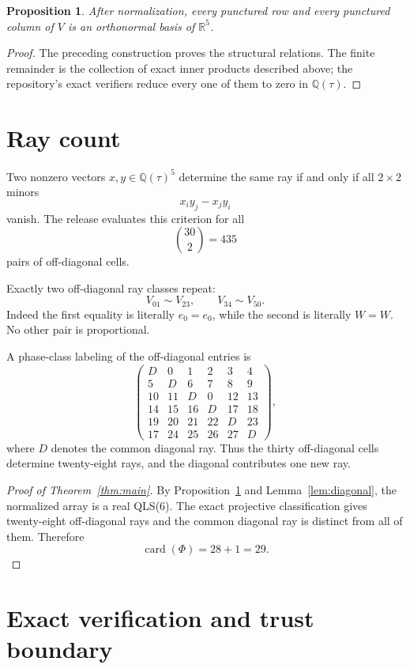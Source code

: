 \documentclass[11pt]{article}
\newtheorem{proposition}[theorem]{Proposition}
\theoremstyle{definition}
\theoremstyle{plain}
\newcommand{\R}{\mathbb{R}}
\newcommand{\Q}{\mathbb{Q}}
\newcommand{\card}{\operatorname{card}}
\begin{document}
\begin{proposition}\label{prop:punctured}
After normalization, every punctured row and every punctured column of \(V\) is an orthonormal basis of \(\R^5\).
\end{proposition}

\begin{proof}
The preceding construction proves the structural relations.
The finite remainder is the collection of exact inner products described above; the repository's exact verifiers reduce every one of them to zero in \(\Q(\tau)\).
\end{proof}

\section{Ray count}

Two nonzero vectors \(x,y\in\Q(\tau)^5\) determine the same ray if and only if all \(2\times2\) minors
\[
x_i y_j-x_j y_i
\]
vanish.
The release evaluates this criterion for all
\[
\binom{30}{2}=435
\]
pairs of off-diagonal cells.

Exactly two off-diagonal ray classes repeat:
\[
V_{01}\sim V_{23},\qquad V_{34}\sim V_{50}.
\]
Indeed the first equality is literally \(e_0=e_0\), while the second is literally \(W=W\).
No other pair is proportional.

A phase-class labeling of the off-diagonal entries is
\[
\begin{pmatrix}
D&0&1&2&3&4\\
5&D&6&7&8&9\\
10&11&D&0&12&13\\
14&15&16&D&17&18\\
19&20&21&22&D&23\\
17&24&25&26&27&D
\end{pmatrix},
\]
where \(D\) denotes the common diagonal ray.
Thus the thirty off-diagonal cells determine twenty-eight rays, and the diagonal contributes one new ray.

\begin{proof}[Proof of Theorem~\ref{thm:main}]
By Proposition~\ref{prop:punctured} and Lemma~\ref{lem:diagonal}, the normalized array is a real QLS(6).
The exact projective classification gives twenty-eight off-diagonal rays and the common diagonal ray is distinct from all of them.
Therefore
\[
\card(\Phi)=28+1=29.
\]
\end{proof}

\section{Exact verification and trust boundary}
\end{document}
